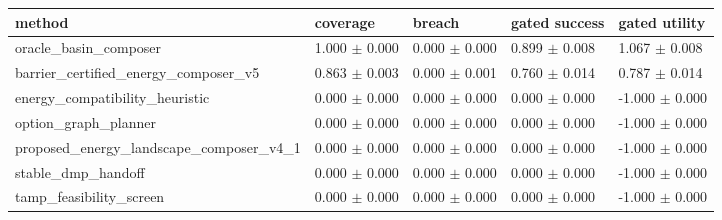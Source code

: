 \begin{tabular}{lllll}
\toprule
method & coverage & breach & gated success & gated utility \\
\midrule
oracle\_basin\_composer & 1.000 $\pm$ 0.000 & 0.000 $\pm$ 0.000 & 0.899 $\pm$ 0.008 & 1.067 $\pm$ 0.008 \\
barrier\_certified\_energy\_composer\_v5 & 0.863 $\pm$ 0.003 & 0.000 $\pm$ 0.001 & 0.760 $\pm$ 0.014 & 0.787 $\pm$ 0.014 \\
energy\_compatibility\_heuristic & 0.000 $\pm$ 0.000 & 0.000 $\pm$ 0.000 & 0.000 $\pm$ 0.000 & -1.000 $\pm$ 0.000 \\
option\_graph\_planner & 0.000 $\pm$ 0.000 & 0.000 $\pm$ 0.000 & 0.000 $\pm$ 0.000 & -1.000 $\pm$ 0.000 \\
proposed\_energy\_landscape\_composer\_v4\_1 & 0.000 $\pm$ 0.000 & 0.000 $\pm$ 0.000 & 0.000 $\pm$ 0.000 & -1.000 $\pm$ 0.000 \\
stable\_dmp\_handoff & 0.000 $\pm$ 0.000 & 0.000 $\pm$ 0.000 & 0.000 $\pm$ 0.000 & -1.000 $\pm$ 0.000 \\
tamp\_feasibility\_screen & 0.000 $\pm$ 0.000 & 0.000 $\pm$ 0.000 & 0.000 $\pm$ 0.000 & -1.000 $\pm$ 0.000 \\
\bottomrule
\end{tabular}
